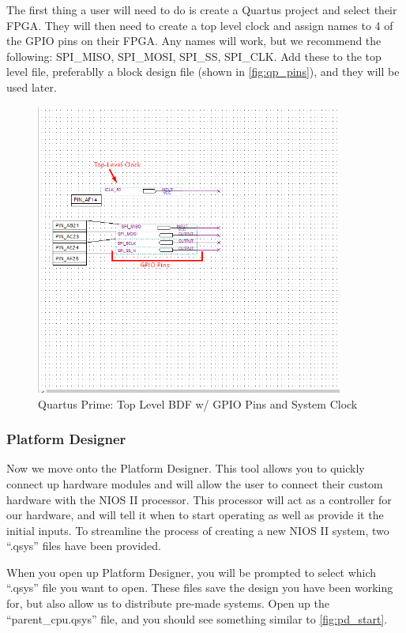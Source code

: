 The first thing a user will need to do is create a Quartus project and select their FPGA. They will then need to create a top level clock and assign names to 4 of the GPIO pins on their FPGA. Any names will work, but we recommend the following: SPI\_MISO, SPI\_MOSI, SPI\_SS, SPI\_CLK. Add these to the top level file, preferablly a block design file (shown in \autoref{fig:qp_pins}), and they will be used later.

\begin{figure}[!htb]
    \centering
    \includegraphics[width=0.9\textwidth]{05_evaluation/images/just_pins.png}
    \caption{Quartus Prime: Top Level BDF w/ GPIO Pins and System Clock }
    \label{fig:qp_pins}
\end{figure}

\subsubsection{Platform Designer}

Now we move onto the Platform Designer. This tool allows you to quickly connect up hardware modules and will allow the user to connect their custom hardware with the NIOS II processor. This processor will act as a controller for our hardware, and will tell it when to start operating as well as provide it the initial inputs. To streamline the process of creating a new NIOS II system, two “.qsys” files have been provided. 

When you open up Platform Designer, you will be prompted to select which “.qsys” file you want to open. These files save the design you have been working for, but also allow us to distribute pre-made systems. Open up the “parent\_cpu.qsys” file, and you should see something similar to \autoref{fig:pd_start}.

